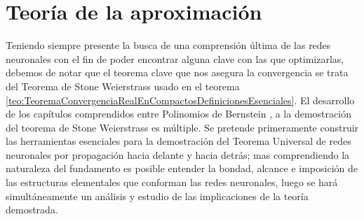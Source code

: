 
\chapter{Teoría de la aproximación}
 
Teniendo siempre presente la busca de una comprensión última de las redes neuronales
con el fin de poder encontrar alguna clave con las que optimizarlas, debemos de 
notar que el teorema clave que nos asegura la convergencia se trata del Teorema de Stone Weierstrass
usado en el teorema \ref{teo:TeoremaConvergenciaRealEnCompactosDefinicionesEsenciales}.
El desarrollo de los capítulos comprendidos entre Polinomios de Bernstein , 
a la demostración del teorema de Stone Weierstrass  es múltiple.
Se pretende primeramente construir las herramientas esenciales para la demostración del 
Teorema Universal de redes neuronales por propagación hacia delante y hacia detrás; 
mas comprendiendo la naturaleza del fundamento es posible entender la bondad, alcance e imposición
de las estructuras elementales que conforman las redes neuronales, luego se hará simultáneamente
un análisis y estudio de las implicaciones de la teoría demostrada. 




